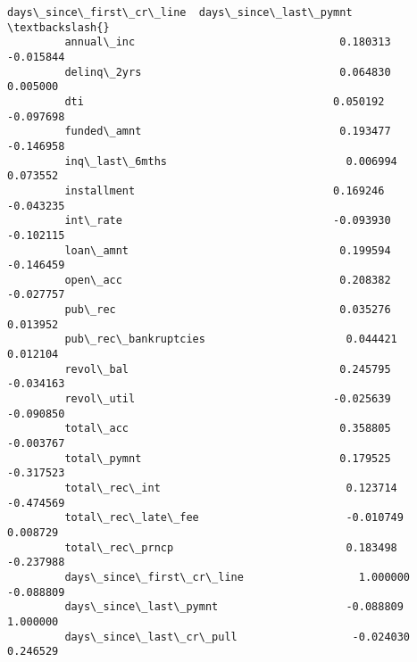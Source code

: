 \documentclass[10pt,notitlepage,onecolumn,aps,pra]{revtex4-1}
\begin{document}
\begin{Verbatim}[commandchars=\\\{\}]
                                   days\_since\_first\_cr\_line  days\_since\_last\_pymnt  \textbackslash{}
         annual\_inc                                0.180313              -0.015844   
         delinq\_2yrs                               0.064830               0.005000   
         dti                                       0.050192              -0.097698   
         funded\_amnt                               0.193477              -0.146958   
         inq\_last\_6mths                            0.006994               0.073552   
         installment                               0.169246              -0.043235   
         int\_rate                                 -0.093930              -0.102115   
         loan\_amnt                                 0.199594              -0.146459   
         open\_acc                                  0.208382              -0.027757   
         pub\_rec                                   0.035276               0.013952   
         pub\_rec\_bankruptcies                      0.044421               0.012104   
         revol\_bal                                 0.245795              -0.034163   
         revol\_util                               -0.025639              -0.090850   
         total\_acc                                 0.358805              -0.003767   
         total\_pymnt                               0.179525              -0.317523   
         total\_rec\_int                             0.123714              -0.474569   
         total\_rec\_late\_fee                       -0.010749               0.008729   
         total\_rec\_prncp                           0.183498              -0.237988   
         days\_since\_first\_cr\_line                  1.000000              -0.088809   
         days\_since\_last\_pymnt                    -0.088809               1.000000   
         days\_since\_last\_cr\_pull                  -0.024030               0.246529   
         

\end{Verbatim}
\end{document}
